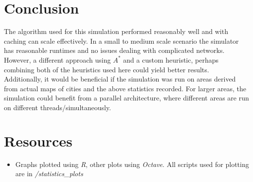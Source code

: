 \documentclass{article}
\begin{document}
		\section{Conclusion}
		The algorithm used for this simulation performed reasonably well and with caching can scale effectively. In a small to medium scale scenario
		the simulator has reasonable runtimes and no issues dealing with complicated networks. However, a different approach
		using $A^*$ and a custom heuristic, perhaps combining both of the heuristics used here could yield better results. Additionally, it would
		be beneficial if the simulation was run on areas derived from actual maps of cities and the above statistics recorded. For larger areas,
		the simulation could benefit from a parallel architecture, where different areas are run on different threads/simultaneously.

		\section{Resources}
		\begin{itemize}
			\item Graphs plotted using \textit{R}, other plots using \textit{Octave}. All scripts used for plotting are in \textit{/statistics\_plots}
		\end{itemize}
\end{document}

